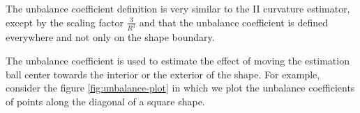 The unbalance coefficient definition is very similar to the II curvature estimator, except by the scaling factor $\frac{3}{R^3}$ and that the unbalance coefficient is defined everywhere and not only on the shape boundary.

The unbalance coefficient is used to estimate the effect of moving the estimation ball center towards the interior or the exterior of the shape. For example, consider the figure \ref{fig:unbalance-plot} in which we plot the unbalance coefficients of points along the diagonal of a square shape. 

\begin{figure}[h!]
\center
\begin{minipage}{0.25\textwidth}
\\%
\\%

\end{minipage}
\end{figure}
